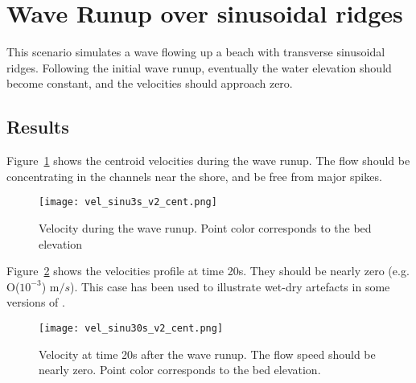 \section{Wave Runup over sinusoidal ridges}
This scenario simulates a wave flowing up a beach with transverse sinusoidal ridges. Following the initial wave runup, eventually the water elevation should become constant, and the velocities should approach zero. 

\subsection{Results}
Figure~\ref{runupsinusoidfig1} shows the centroid velocities during the wave runup. The flow should be concentrating in the channels near the shore, and be free from major spikes.

\begin{figure}[h]
\begin{center}
\texttt{[image: vel\_sinu3s\_v2\_cent.png]}
\caption{Velocity during the wave runup. Point color corresponds to the bed elevation}
\label{runupsinusoidfig1}
\end{center}
\end{figure}

Figure~\ref{runupsinusoidfig2} shows the velocities profile at time 20s. They should be nearly zero (e.g. O($10^{-3}$) m$/s$). This case has been used to illustrate wet-dry artefacts in some versions of \anuga.

\begin{figure}[h]
\begin{center}
\texttt{[image: vel\_sinu30s\_v2\_cent.png]}
\caption{Velocity at time 20s after the wave runup. The flow speed should be nearly zero. Point color corresponds to the bed elevation.}
\label{runupsinusoidfig2}
\end{center}
\end{figure}

\endinput
